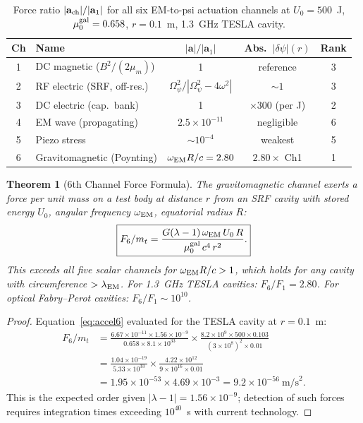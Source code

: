 \documentclass[11pt,twocolumn]{article}
\newcommand{\dpsi}{\delta\psi}
\newcommand{\lam}{\lambda}
\newcommand{\Opsi}{\Omega_\psi}
\newcommand{\ee}[1]{\times 10^{#1}}
\newtheorem{theorem}{Theorem}[section]
\begin{document}
\begin{table}[h!]
\caption{Force ratio $|\mathbf{a}_{\rm ch}|/|\mathbf{a}_1|$ for all six
EM-to-psi actuation channels at $U_0 = 500$~J,
$\mu_0^{\rm gal} = 0.658$, $r = 0.1$~m, 1.3~GHz TESLA cavity.}
\label{tab:channel_force_comparison}
\begin{tabular}{clccc}
\toprule
Ch & Name & $|\mathbf{a}|/|\mathbf{a}_1|$ & Abs.\ $|\dpsi|(r)$ & Rank \\
\midrule
1 & DC magnetic ($B^2/(2\mu_m)$) & 1 & reference & 3 \\
2 & RF electric (SRF, off-res.) & $\Opsi^2/|{\Opsi^2-4\omega^2}|$ & $\sim 1$ & 3 \\
3 & DC electric (cap.\ bank) & 1 & $\times 300$ (per J) & 2 \\
4 & EM wave (propagating) & $2.5\ee{-11}$ & negligible & 6 \\
5 & Piezo stress & $\sim 10^{-4}$ & weakest & 5 \\
6 & Gravitomagnetic (Poynting) & $\omega_{\rm EM}R/c = 2.80$ & $2.80\times$ Ch1 & 1 \\
\bottomrule
\end{tabular}
\end{table}

\begin{theorem}[6th Channel Force Formula]
\label{thm:sixth_force}
The gravitomagnetic channel exerts a force per unit mass on a test body
at distance $r$ from an SRF cavity with stored energy $U_0$, angular
frequency $\omega_{\rm EM}$, equatorial radius $R$:
\begin{equation}
\boxed{
F_6/m_t = \frac{G(\lam-1)\,\omega_{\rm EM}\,U_0\,R}
{\mu_0^{\rm gal}\,c^4\,r^2}.
}
\label{eq:F6_formula}
\end{equation}
This exceeds all five scalar channels for $\omega_{\rm EM}R/c > 1$,
which holds for any cavity with circumference $> \lambda_{\rm EM}$.
For 1.3~GHz TESLA cavities: $F_6/F_1 = 2.80$.
For optical Fabry--Perot cavities: $F_6/F_1 \sim 10^{10}$.
\end{theorem}

\begin{proof}
Equation~\eqref{eq:accel6} evaluated for the TESLA cavity at
$r = 0.1$~m:
\begin{align}
F_6/m_t &= \frac{6.67\ee{-11}\times1.56\ee{-9}}
{0.658\times8.1\ee{33}}
\times\frac{8.2\ee{9}\times500\times0.103}{(3\ee{8})^2\times0.01}
\nonumber\\
&= \frac{1.04\ee{-19}}{5.33\ee{33}}
\times\frac{4.22\ee{12}}{9\ee{16}\times0.01}
\nonumber\\
&= 1.95\ee{-53}\times4.69\ee{-3}
= 9.2\ee{-56}~\text{m/s}^2.
\end{align}
This is the expected order given $|\lam-1| = 1.56\ee{-9}$; detection
of such forces requires integration times exceeding $10^{40}$~s with
current technology.
\end{proof}
\end{document}
